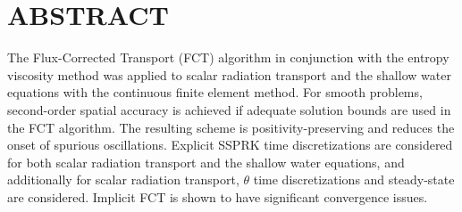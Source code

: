\chapter*{ABSTRACT}

\pagestyle{plain} %
\setcounter{page}{2}

\indent
The Flux-Corrected Transport (FCT) algorithm in conjunction with the
entropy viscosity method was applied to scalar radiation transport and
the shallow water equations with the continuous finite element method.
For smooth problems, second-order spatial accuracy is achieved if adequate
solution bounds are used in the FCT algorithm. The resulting scheme is
positivity-preserving and reduces the onset of spurious oscillations.
Explicit SSPRK time discretizations are considered for both scalar
radiation transport and the shallow water equations, and additionally
for scalar radiation transport, $\theta$ time discretizations and
steady-state are considered. Implicit FCT is shown to have significant
convergence issues.

\pagebreak{}
